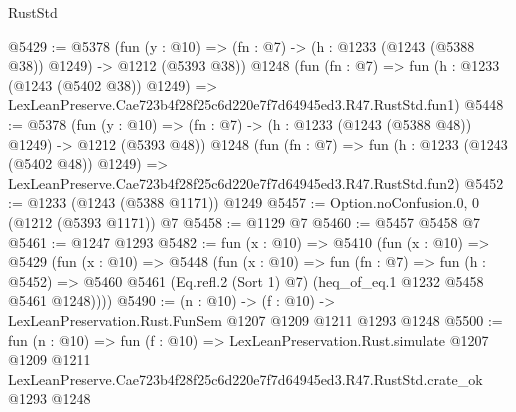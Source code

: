 \begin{lexlean}{RustStd}
\begin{coremodule}
@5429 := @5378
    (fun (y : @10) => (fn : @7) -> (h : @1233 (@1243 (@5388 @38)) @1249) -> @1212 (@5393 @38))
    @1248
    (fun (fn : @7) =>
    fun (h : @1233 (@1243 (@5402 @38)) @1249) =>
    LexLeanPreserve.Cae723b4f28f25c6d220e7f7d64945ed3.R47.RustStd.fun1)
@5448 := @5378
    (fun (y : @10) => (fn : @7) -> (h : @1233 (@1243 (@5388 @48)) @1249) -> @1212 (@5393 @48))
    @1248
    (fun (fn : @7) =>
    fun (h : @1233 (@1243 (@5402 @48)) @1249) =>
    LexLeanPreserve.Cae723b4f28f25c6d220e7f7d64945ed3.R47.RustStd.fun2)
@5452 := @1233 (@1243 (@5388 @1171)) @1249
@5457 := Option.noConfusion.{0, 0} (@1212 (@5393 @1171)) @7
@5458 := @1129 @7
@5460 := @5457 @5458 @7
@5461 := @1247 @1293
@5482 := fun (x : @10) =>
  @5410
    (fun (x : @10) =>
    @5429
      (fun (x : @10) =>
      @5448
        (fun (x : @10) =>
        fun (fn : @7) =>
        fun (h : @5452) =>
        @5460 @5461 (Eq.refl.{2} (Sort 1) @7) (heq_of_eq.{1} @1232 @5458 @5461 @1248))))
@5490 := (n : @10) -> (f : @10) -> LexLeanPreservation.Rust.FunSem @1207 @1209 @1211 @1293 @1248
@5500 := fun (n : @10) =>
  fun (f : @10) =>
  LexLeanPreservation.Rust.simulate
    @1207
    @1209
    @1211
    LexLeanPreserve.Cae723b4f28f25c6d220e7f7d64945ed3.R47.RustStd.crate_ok
    @1293
    @1248
\end{coremodule}
\end{lexlean}
